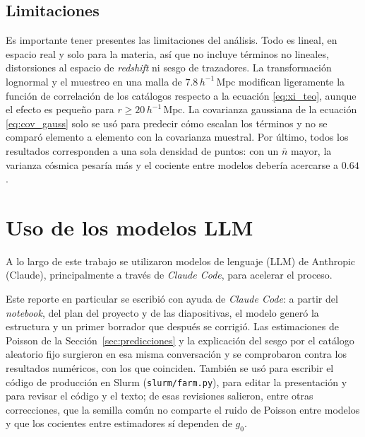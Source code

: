 \documentclass[letterpaper, 12pt]{article}
\newcommand{\hMpc}{\ensuremath{h^{-1}\,\mathrm{Mpc}}}
\begin{document}
        \subsection{Limitaciones}

            Es importante tener presentes las limitaciones del análisis. Todo es lineal, en espacio real y solo para la materia, así que no incluye términos no lineales, distorsiones al espacio de \emph{redshift} ni sesgo de trazadores. La transformación lognormal y el muestreo en una malla de $7.8\,\hMpc$ modifican ligeramente la función de correlación de los catálogos respecto a la ecuación \eqref{eq:xi_teo}, aunque el efecto es pequeño para $r \geq 20\,\hMpc$. La covarianza gaussiana de la ecuación \eqref{eq:cov_gauss} solo se usó para predecir cómo escalan los términos y no se comparó elemento a elemento con la covarianza muestral. Por último, todos los resultados corresponden a una sola densidad de puntos: con un $\bar n$ mayor, la varianza cósmica pesaría más y el cociente entre modelos debería acercarse a $0.64$.

    \section{Uso de los modelos LLM}\label{sec:llm}

        A lo largo de este trabajo se utilizaron modelos de lenguaje (LLM) de Anthropic (Claude), principalmente a través de \emph{Claude Code}, para acelerar el proceso.

        Este reporte en particular se escribió con ayuda de \emph{Claude Code}: a partir del \emph{notebook}, del plan del proyecto y de las diapositivas, el modelo generó la estructura y un primer borrador que después se corrigió. Las estimaciones de Poisson de la Sección~\ref{sec:predicciones} y la explicación del sesgo por el catálogo aleatorio fijo surgieron en esa misma conversación y se comprobaron contra los resultados numéricos, con los que coinciden. También se usó para escribir el código de producción en Slurm (\texttt{slurm/farm.py}), para editar la presentación y para revisar el código y el texto; de esas revisiones salieron, entre otras correcciones, que la semilla común no comparte el ruido de Poisson entre modelos y que los cocientes entre estimadores sí dependen de $g_0$.
\end{document}
